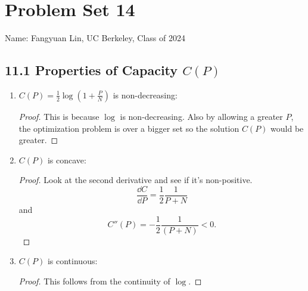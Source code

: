 \documentclass[../main.tex]{subfiles}
\begin{document}
\section*{Problem Set 14}
    Name: Fangyuan Lin, UC Berkeley, Class of 2024


\subsection*{11.1 Properties of Capacity $C(P)$}
\begin{enumerate}
    \item $C(P)=\frac{1}{2}\log(1+\frac{P}{N})$ is non-decreasing: \begin{proof}
        This is because $\log$ is non-decreasing. Also by allowing a greater $P$, the optimization problem is over a bigger set so the solution $C(P)$ would be greater.
        \end{proof}
    \item $C(P)$ is concave: \begin{proof}
        Look at the second derivative and see if it's non-positive.
        \[
        \frac{\dd C}{\dd P}=\frac{1}{2}\frac{1}{P+N}
        \] and \[
        C''(P)=-\frac{1}{2}\frac{1}{(P+N)} < 0.
        \]
    \end{proof}
    \item $C(P)$ is continuous: 
    \begin{proof}
        This follows from the continuity of $\log$.
    \end{proof}
\end{enumerate}
\end{document}
